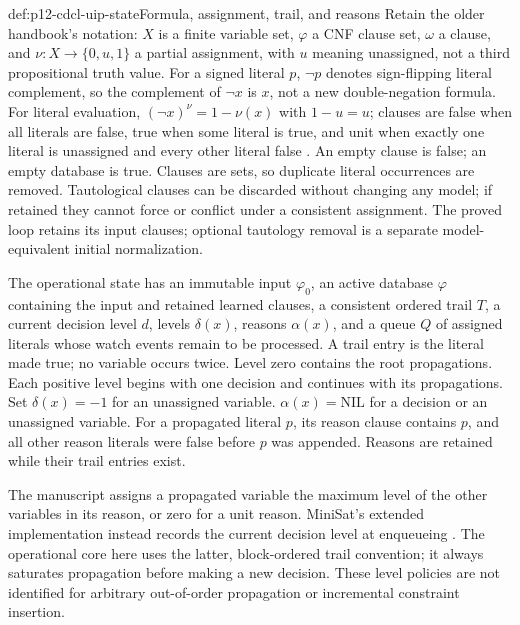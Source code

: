 \begin{hbdefinition}{def:p12-cdcl-uip-state}{Formula, assignment, trail, and reasons}
Retain the older handbook's notation: \(X\) is a finite variable set,
\(\varphi\) a CNF clause set, \(\omega\) a clause, and
\(\nu:X\to\{0,u,1\}\) a partial assignment, with \(u\) meaning
unassigned, not a third propositional truth value.  For a signed literal
\(p\), \(\neg p\) denotes sign-flipping literal complement, so the
complement of \(\neg x\) is \(x\), not a new double-negation formula.
For literal evaluation,
\((\neg x)^\nu=1-\nu(x)\) with \(1-u=u\); clauses are false when all
literals are false, true when some literal is true, and unit when exactly one
literal is unassigned and every other literal false
\cite[Sec.~4.2]{MarquesSilvaLynceMalik2008CDCLManuscript}.  An empty clause
is false; an empty database is true.  Clauses are sets, so duplicate literal
occurrences are removed.  Tautological clauses can be discarded without
changing any model; if retained they cannot force or conflict under a
consistent assignment.  The proved loop retains its input clauses; optional
tautology removal is a separate model-equivalent initial normalization.

The operational state has an immutable input \(\varphi_0\), an active
database \(\varphi\) containing the input and retained learned clauses, a
consistent ordered trail \(T\), a current decision level \(d\), levels
\(\delta(x)\), reasons \(\alpha(x)\), and a queue \(Q\) of assigned
literals whose watch events remain to be processed.  A trail entry is the
literal made true; no variable occurs twice.  Level zero contains the root
propagations.  Each positive level begins with one decision and continues
with its propagations.  Set \(\delta(x)=-1\) for an unassigned variable.
\(\alpha(x)=\mathrm{NIL}\) for a decision or an
unassigned variable.  For a propagated literal \(p\), its reason clause
contains \(p\), and all other reason literals were false before \(p\)
was appended.  Reasons are retained while their trail entries exist.

The manuscript assigns a propagated variable the maximum level of the other
variables in its reason, or zero for a unit reason.  MiniSat's extended
implementation instead records the current decision level at enqueueing
\cite[Eq.~(4.6)]{MarquesSilvaLynceMalik2008CDCLManuscript}
\cite[Fig.~9]{EenSorenssonMiniSatExtended12}.  The operational core here uses
the latter, block-ordered trail convention; it always saturates propagation
before making a new decision.  These level policies are not identified for
arbitrary out-of-order propagation or incremental constraint insertion.
\end{hbdefinition}

